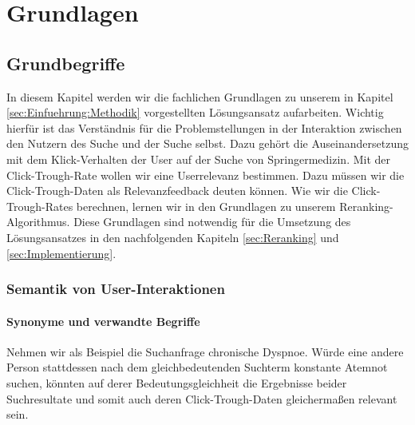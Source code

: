 %
\chapter{Grundlagen}
\label{sec:Grundlagen}


\section{Grundbegriffe}
\label{sec:Grundlagen:Grundbegriffe}

In diesem Kapitel werden wir die fachlichen Grundlagen zu unserem in Kapitel \ref{sec:Einfuehrung:Methodik} vorgestellten Lösungsansatz aufarbeiten. Wichtig hierfür ist das Verständnis für die Problemstellungen in der Interaktion zwischen den Nutzern des Suche und der Suche selbst. Dazu gehört die Auseinandersetzung mit dem Klick-Verhalten der User auf der Suche von Springermedizin. Mit der Click-Trough-Rate wollen wir eine Userrelevanz bestimmen. Dazu müssen wir die Click-Trough-Daten als Relevanzfeedback deuten können. Wie wir die Click-Trough-Rates berechnen, lernen wir in den Grundlagen zu unserem Reranking-Algorithmus. Diese Grundlagen sind notwendig für die Umsetzung des Lösungsansatzes in den nachfolgenden Kapiteln \ref{sec:Reranking} und \ref{sec:Implementierung}.


\subsection{Semantik von User-Interaktionen}
\label{sec:Grundlagen:SemantikUserInteraktionen}

\subsubsection{Synonyme und verwandte Begriffe}
\label{sec:Grundlagen:SemantikUserInteraktionen:SynonymeVerwandte Begriffe}

Nehmen wir als Beispiel die Suchanfrage \glqq chronische Dyspnoe\grqq{}. Würde eine andere Person stattdessen nach dem gleichbedeutenden Suchterm \glqq konstante Atemnot\grqq{} suchen, könnten auf derer Bedeutungsgleichheit die Ergebnisse beider Suchresultate und somit auch deren Click-Trough-Daten gleichermaßen relevant sein. 

